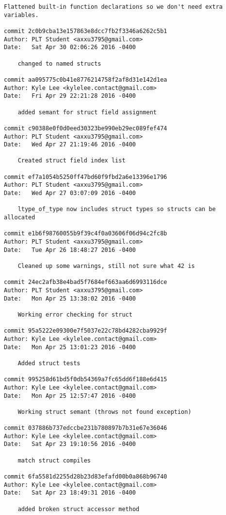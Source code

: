 \begin{lstlisting}[backgroundcolor=\color{white}]
    Flattened built-in function declarations so we don't need extra variables.

commit 2c0b9cba13e157863e8dcc7fb2f3346a6262c5b1
Author: PLT Student <axxu3795@gmail.com>
Date:   Sat Apr 30 02:06:26 2016 -0400

    changed to named structs

commit aa095775c0b41e8776214758f2af8d31e142d1ea
Author: Kyle Lee <kylelee.contact@gmail.com>
Date:   Fri Apr 29 22:21:28 2016 -0400

    added semant for struct field assignment

commit c90388e0f0d0eed30323be990eb29ec089fef474
Author: PLT Student <axxu3795@gmail.com>
Date:   Wed Apr 27 21:19:46 2016 -0400

    Created struct field index list

commit ef7a1054b5250ff47bd60f9fbd2a6e13396e1796
Author: PLT Student <axxu3795@gmail.com>
Date:   Wed Apr 27 03:07:09 2016 -0400

    ltype_of_type now includes struct types so structs can be allocated

commit e1b6f98760055b9f39c4f0a03606f06d94c2fc8b
Author: PLT Student <axxu3795@gmail.com>
Date:   Tue Apr 26 18:48:27 2016 -0400

    Cleaned up some warnings, still not sure what 42 is

commit 24ec2afb38e4bad5f7684ef663aa6d6993116dce
Author: PLT Student <axxu3795@gmail.com>
Date:   Mon Apr 25 13:38:02 2016 -0400

    Working error checking for struct

commit 95a5222e09300e7f5037e22c78bd4282cba9929f
Author: Kyle Lee <kylelee.contact@gmail.com>
Date:   Mon Apr 25 13:01:23 2016 -0400

    Added struct tests

commit 995258d61bd5f0db54369a7fc65dd6f188e6d415
Author: Kyle Lee <kylelee.contact@gmail.com>
Date:   Mon Apr 25 12:57:47 2016 -0400

    Working struct semant (throws not found exception)

commit 037886b737edccbe231b780897b7b31e67e36046
Author: Kyle Lee <kylelee.contact@gmail.com>
Date:   Sat Apr 23 19:10:56 2016 -0400

    match struct compiles

commit 6fa5581d2255d28b23d83efafd00b0a868b96740
Author: Kyle Lee <kylelee.contact@gmail.com>
Date:   Sat Apr 23 18:49:31 2016 -0400

    added broken struct accessor method


\end{lstlisting}
